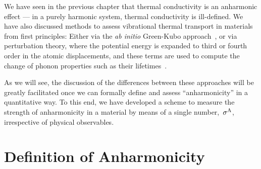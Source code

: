 \label{chp:anharmonicity}

We have seen in the previous chapter that thermal conductivity is an anharmonic effect --- in a purely harmonic system, thermal conductivity is ill-defined. We have also discussed methods to assess vibrational thermal transport in materials from first principles: Either via the \emph{ab initio} Green-Kubo approach~\cite{Marcolongo.2016,Carbogno.2016}, or via perturbation theory, where the potential energy is expanded to third or fourth order in the atomic displacements, and these terms are used to compute the change of phonon properties such as their lifetimes~\cite{Broido.2007,Simoncelli.2019,Isaeva.2019,Feng.2016,Feng.2017,Ravichandran.2018,Xia.2018}.

As we will see, the discussion of the differences between these approaches will be greatly facilitated once we can formally define and assess ``anharmonicity'' in a quantitative way. To this end, we have developed a scheme to measure the strength of anharmonicity in a material by means of a single number,~$\sigma^\mathrm{A}$, irrespective of physical observables.



\section{Definition of Anharmonicity}
\label{sec:anharmonicity.definition}

